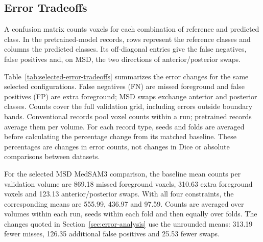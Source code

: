 \documentclass[12pt,a4paper]{article}
\begin{document}
\subsection{Error Tradeoffs}
\label{sec:complete-error-tables}
A confusion matrix counts voxels for each combination of reference and
predicted class. In the pretrained-model records, rows represent the
reference classes and columns the predicted classes. Its off-diagonal
entries give the false negatives, false positives and, on MSD, the two
directions of anterior/posterior swaps.

Table~\ref{tab:selected-error-tradeoffs} summarizes the error changes
for the same selected configurations. False negatives (FN) are missed
foreground and false positives (FP) are extra foreground; MSD swaps
exchange anterior and posterior classes. Counts cover the full validation
grid, including errors outside boundary bands. Conventional records pool
voxel counts within a run; pretrained records average them per volume.
For each record type, seeds and folds are averaged before calculating
the percentage change from its matched baseline. These percentages are
changes in error counts, not changes in Dice or absolute comparisons
between datasets.

For the selected MSD MedSAM3 comparison, the baseline mean counts per
validation volume are 869.18 missed foreground voxels, 310.63 extra
foreground voxels and 123.13 anterior/posterior swaps. With all four
constraints, the corresponding means are 555.99, 436.97 and 97.59.
Counts are averaged over volumes within each run, seeds within each
fold and then equally over folds. The changes quoted in
Section~\ref{sec:error-analysis} use the unrounded means: 313.19 fewer
misses, 126.35 additional false positives and 25.53 fewer swaps.
\end{document}
